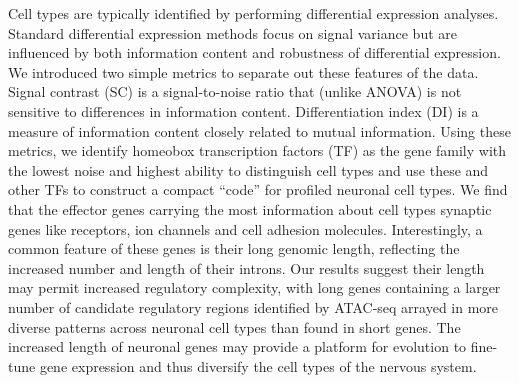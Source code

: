 Cell types are typically identified by performing differential expression analyses. Standard differential expression methods focus on signal variance but are influenced by both information content and robustness of differential expression. We introduced two simple metrics to separate out these features of the data. Signal contrast (SC) is a signal-to-noise ratio that (unlike ANOVA) is not sensitive to differences in information content. Differentiation index (DI) is a measure of information content closely related to mutual information. Using these metrics, we identify homeobox transcription factors (TF) as the gene family with the lowest noise and highest ability to distinguish cell types and use these and other TFs to construct a compact “code” for profiled neuronal cell types. We find that the effector genes carrying the most information about cell types synaptic genes like receptors, ion channels and cell adhesion molecules. Interestingly, a common feature of these genes is their long genomic length, reflecting the increased number and length of their introns. 
Our results suggest their length may permit increased regulatory complexity, with long genes containing a larger number of candidate regulatory regions identified by ATAC-seq arrayed in more diverse patterns across neuronal cell types than found in short genes. The increased length of neuronal genes may provide a platform for evolution to fine-tune gene expression and thus diversify the cell types of the nervous system.
